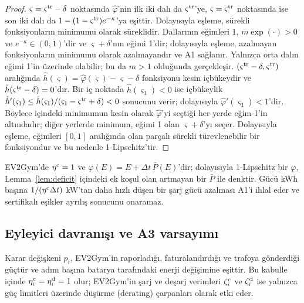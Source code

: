 \begin{proof}
$\varsigma=\varsigma^{\mathrm{tr}}-\delta$ noktasında $\hat\varphi$'nin ilk iki dalı da $\varsigma^{\mathrm{tr}}$'ye, $\varsigma=\varsigma^{\mathrm{tr}}$ noktasında ise son iki dalı da $1-(1-\varsigma^{\mathrm{tr}})e^{-\kappa}$'ya eşittir.
Dolayısıyla eşleme, sürekli fonksiyonların minimumu olarak süreklidir.
Dallarının eğimleri $1$, $m\exp(\cdot)>0$ ve $e^{-\kappa}\in(0,1)$'dir ve $\varsigma+\delta$'nın eğimi 1'dir; dolayısıyla eşleme, azalmayan fonksiyonların minimumu olarak azalmayandır ve A1 sağlanır.
Yalnızca orta dalın eğimi 1'in üzerinde olabilir; bu da $m>1$ olduğunda gerçekleşir.
$(\varsigma^{\mathrm{tr}}-\delta,\varsigma^{\mathrm{tr}})$ aralığında $\hat h(\varsigma)=\hat\varphi(\varsigma)-\varsigma-\delta$ fonksiyonu kesin içbükeydir ve $\hat h(\varsigma^{\mathrm{tr}}-\delta)=0$'dır.
Bir iç noktada $\hat h(\varsigma_1)<0$ ise içbükeylik $\hat h'(\varsigma_1)\le \hat h(\varsigma_1)/(\varsigma_1-\varsigma^{\mathrm{tr}}+\delta)<0$ sonucunu verir; dolayısıyla $\hat\varphi'(\varsigma_1)<1$'dir.
Böylece  içindeki minimumun kesin olarak $\hat\varphi$'yi seçtiği her yerde eğim 1'in altındadır; diğer yerlerde minimum, eğimi 1 olan $\varsigma+\delta$'yı seçer.
Dolayısıyla eşleme, eğimleri $[0,1]$ aralığında olan parçalı sürekli türevlenebilir bir fonksiyondur ve bu nedenle 1-Lipschitz'tir.
\end{proof}

EV2Gym'de $\eta^{\mathrm c}=1$ ve $\varphi(E)=E+\Delta t\,\bar P(E)$'dir; dolayısıyla 1-Lipschitz bir $\varphi$, Lemma~\ref{lem:deficit} içindeki ek koşul olan artmayan bir $\bar P$ ile denktir.
Gücü kWh başına $1/(\eta^{\mathrm c}\Delta t)$ kW'tan daha hızlı düşen bir şarj gücü azalması A1'i ihlal eder ve sertifikalı eşikler ayrılış sonucunu onaramaz.

\subsection{Eyleyici davranışı ve A3 varsayımı}\label{app:actuation}

Karar değişkeni $p_i$, EV2Gym'in raporladığı, faturalandırdığı ve trafoya gönderdiği güçtür ve adım başına batarya tarafındaki enerji değişimine eşittir.
Bu kabulle  içinde $\eta_i^{\mathrm c}=\eta_i^{\mathrm d}=1$ olur; EV2Gym'in şarj ve deşarj verimleri $\zeta_i^{\mathrm c}$ ve $\zeta_i^{\mathrm d}$ ise yalnızca güç limitleri üzerinde düşürme (derating) çarpanları olarak etki eder.


